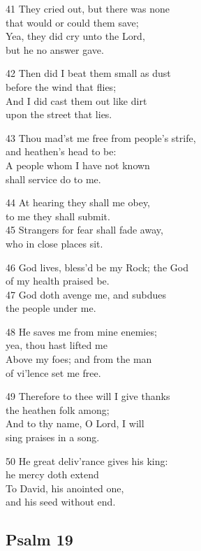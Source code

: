 41 They cried out, but there was none\\
that would or could them save;\\
Yea, they did cry unto the Lord,\\
but he no answer gave.

42 Then did I beat them small as dust\\
before the wind that flies;\\
And I did cast them out like dirt\\
upon the street that lies.

43 Thou mad’st me free from people’s strife,\\
and heathen’s head to be:\\
A people whom I have not known\\
shall service do to me.

44 At hearing they shall me obey,\\
to me they shall submit.\\
45 Strangers for fear shall fade away,\\
who in close places sit.

46 God lives, bless’d be my Rock; the God\\
of my health praised be.\\
47 God doth avenge me, and subdues\\
the people under me.

48 He saves me from mine enemies;\\
yea, thou hast lifted me\\
Above my foes; and from the man\\
of vi’lence set me free.

49 Therefore to thee will I give thanks\\
the heathen folk among;\\
And to thy name, O Lord, I will\\
sing praises in a song.

50 He great deliv’rance gives his king:\\
he mercy doth extend\\
To David, his anointed one,\\
and his seed without end.

\begin{center}
\quad{}\quad{}
\end{center}

\subsection*{Psalm 19 }

